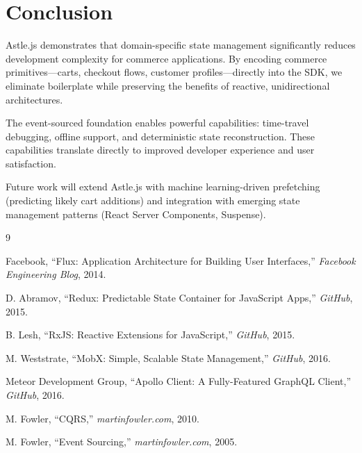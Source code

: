 \section{Conclusion}


Astle.js demonstrates that domain-specific state management significantly reduces development complexity for commerce applications. By encoding commerce primitives—carts, checkout flows, customer profiles—directly into the SDK, we eliminate boilerplate while preserving the benefits of reactive, unidirectional architectures.

The event-sourced foundation enables powerful capabilities: time-travel debugging, offline support, and deterministic state reconstruction. These capabilities translate directly to improved developer experience and user satisfaction.

Future work will extend Astle.js with machine learning-driven prefetching (predicting likely cart additions) and integration with emerging state management patterns (React Server Components, Suspense).

\begin{thebibliography}{9}

Facebook, ``Flux: Application Architecture for Building User Interfaces,'' \textit{Facebook Engineering Blog}, 2014.

D. Abramov, ``Redux: Predictable State Container for JavaScript Apps,'' \textit{GitHub}, 2015.

B. Lesh, ``RxJS: Reactive Extensions for JavaScript,'' \textit{GitHub}, 2015.

M. Weststrate, ``MobX: Simple, Scalable State Management,'' \textit{GitHub}, 2016.

Meteor Development Group, ``Apollo Client: A Fully-Featured GraphQL Client,'' \textit{GitHub}, 2016.

M. Fowler, ``CQRS,'' \textit{martinfowler.com}, 2010.

M. Fowler, ``Event Sourcing,'' \textit{martinfowler.com}, 2005.

\end{thebibliography}

